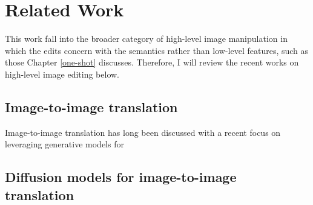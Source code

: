 \section{Related Work}\label{zero-shot-RW}
This work fall into the broader category of high-level image manipulation in which the edits concern with the semantics rather than low-level features, such as those Chapter \ref{one-shot} discusses. Therefore, I will review the recent works on high-level image editing below.
\subsection{Image-to-image translation}
Image-to-image translation has long been discussed with a recent focus on leveraging generative models for 

\subsection{Diffusion models for image-to-image translation}